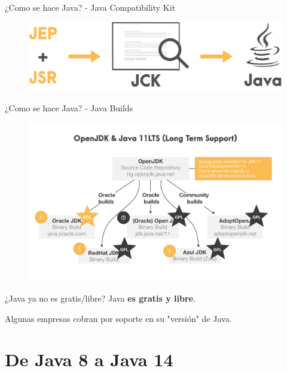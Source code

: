 \documentclass[aspectratio=169]{beamer}
\begin{document}
\begin{frame}[fragile]{¿Como se hace Java? - Java Compatibility Kit}
	\begin{figure}
		\centering
		\includegraphics[width=0.9\linewidth]{Images/jck}
	\end{figure}
	
\end{frame}

\begin{frame}[fragile]{¿Como se hace Java? - Java Builds}
	\begin{figure}
		\centering
		\includegraphics[width=0.9\linewidth]{Images/javabuilds}
	\end{figure}
	
\end{frame}

\begin{frame}[fragile]{¿Java ya no es gratis/libre?}
Java \textbf{es gratis y libre}.

Algunas empresas cobran por soporte en su "versión" de Java.
\end{frame}

{
    \section{De Java 8 a Java 14}
}
\end{document}
